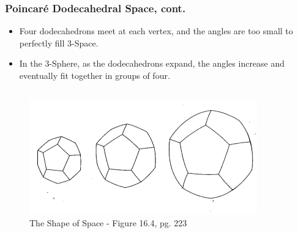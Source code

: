 \documentclass[13pt]{beamer}
\begin{document}
\begin{frame}
\frametitle{Poincar\'e Dodecahedral Space, cont.}
  \begin{itemize}
    \item Four dodecahedrons meet at each vertex, and the angles are too small to perfectly fill 3-Space.
    \item In the 3-Sphere, as the dodecahedrons expand, the angles increase and eventually fit together in groups of four.
  \end{itemize}

  \begin{columns}[c] %
     \centering
      \begin{figure}
        \includegraphics[height=5cm]{./img/poincarespace}
        \caption{The Shape of Space - Figure 16.4, pg. 223}
      \end{figure}
  \end{columns}
\end{frame}

\end{document}
